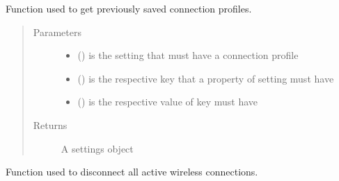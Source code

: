 \documentclass[letterpaper,10pt,english]{sphinxhowto}
\begin{document}

\begin{fulllineitems}
\label{\detokenize{index:nm_dbus_python.connectProfile}}
Function used to get previously saved connection profiles.
\begin{quote}\begin{description}
\item[{Parameters}] \leavevmode\begin{itemize}
\item {} 
 () \textendash{} is the setting that must have a connection profile

\item {} 
 () \textendash{} is the respective key that a property of setting must have

\item {} 
 () \textendash{} is the respective value of key must have

\end{itemize}

\item[{Returns}] \leavevmode
A settings object

\end{description}\end{quote}

\end{fulllineitems}


\begin{fulllineitems}
\label{\detokenize{index:nm_dbus_python.deactive_wireless_conn}}
Function used to disconnect all active wireless connections.

\end{fulllineitems}
\end{document}
